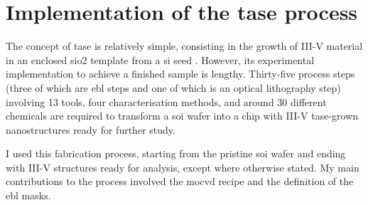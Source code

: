 \section{\texorpdfstring{Implementation of the \acs{tase} process}{Implementation of the TASE process}}
\label{chap:tase}

The concept of \acs{tase} is relatively simple, consisting in the growth of III-V material in an enclosed \acs{sio2} template from a \acl{si} seed \cite{Schmid2015, borgTASEp2018}. However, its experimental implementation to achieve a finished sample is lengthy. Thirty-five process steps (three of which are \acf{ebl} steps and one of which is an optical lithography step) involving 13 tools, four characterisation methods, and around 30 different chemicals are required to transform a \acf{soi} wafer into a chip with III-V \acs{tase}-grown nanostructures ready for further study. 

I used this fabrication process, starting from the pristine \acs{soi} wafer and ending with III-V structures ready for analysis, except where otherwise stated. My main contributions to the process involved the \acs{mocvd} recipe and the definition of the \acs{ebl} masks.

